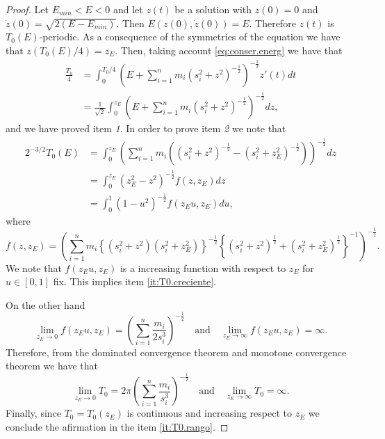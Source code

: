 \documentclass[twoside]{article}
\theoremstyle{remark}
\begin{document}
\begin{proof}
Let $E_{min}<E<0$ and let $z(t)$ be a solution with $z(0)=0$ and $\dot{z}(0)=\sqrt{2(E-E_{min})}$. Then $E(z(0),\dot{z}(0))=E$. Therefore $z(t)$ is $T_0(E)$-periodic. As a consequence of the symmetries of the equation we have that $z(T_0(E)/4)=z_E$. Then, taking account \eqref{eq:conser.energ} we have that
\begin{equation*}
 \begin{split}
  \frac{T_0}{4}&=\int_0^{T_0/4}\left(E+\sum_{i=1}^n m_i (s_i^2+z^2)^{-\frac12}\right)^{-\frac12} z'(t) dt\\
  &=\frac{1}{\sqrt{2}}\int_{0}^{z_E} \left(E+\sum_{i=1}^n m_i (s_i^2+z^2)^{-\frac12}\right)^{-\frac12} dz,
 \end{split}
\end{equation*}
and we have proved item \textit{1}. In order to prove item \textit{2} we note that
\begin{equation*}
 \begin{split}
  2^{-3/2}T_0(E)
  &=
    \int_0^{z_E}\left(\sum_{i=1}^n m_i \left((s_i^2+z^2)^{-\frac12}-(s_i^2+z_E^2)^{-\frac12}\right)\right)^{-\frac12}dz\\
  &=\int_0^{z_E} \left(z_E^2-z^2\right)^{-\frac12} f(z,z_E)dz\\
  &=\int_0^1 \left(1-u^2\right)^{-\frac12} f(z_Eu,z_E)du,
 \end{split}
 \end{equation*}
where \[f(z,z_E)=\left(\sum_{i=1}^n m_i \left\{(s_i^2+z^2)(s_i^2+z_E^2)\right\}^{-\frac12} \left\{(s_i^2+z^2)^{\frac12}+(s_i^2+z_E^2)^{\frac12} \right\}^{-1}\right)^{-\frac12}.\]
We note that $f(z_Eu,z_E)$ is a increasing function with respect to $z_E$ for $u\in [0,1]$ fix. This implies item \ref{it:T0.creciente}.

On the other hand
\begin{equation*}
 \lim\limits_{z_E \to 0}f(z_Eu,z_E)=\left(\sum_{i=1}^{n} \frac{m_i}{2s_i^3}\right)^{-\frac12} \quad \text{and}\quad  \lim\limits_{z_E \to \infty}f(z_Eu,z_E)=\infty.
\end{equation*}
Therefore, from the dominated convergence theorem and monotone convergence theorem we have that
\[\lim\limits_{z_E\to 0}T_0=2\pi\left(\sum_{i=1}^{n} \frac{m_i}{s_i^3}\right)^{-\frac12}\quad \text{and}\quad \lim\limits_{z_E\to \infty}T_0=\infty.\]
Finally,  since $T_0=T_0(z_E)$ is continuous and increasing respect to $z_E$ we conclude the afirmation in the item \ref{it:T0.rango}.
\end{proof}
\end{document}
